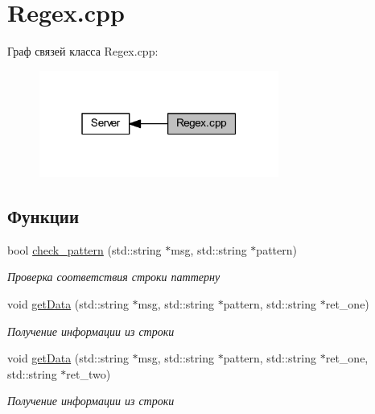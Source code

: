 \hypertarget{group__regexcpp}{}\section{Regex.\+cpp}
\label{group__regexcpp}
Граф связей класса Regex.\+cpp\+:
\nopagebreak
\begin{figure}[H]
\begin{center}
\leavevmode
\includegraphics[width=223pt]{group__regexcpp}
\end{center}
\end{figure}
\subsection*{Функции}
\begin{DoxyCompactItemize}
\item 
bool \mbox{\hyperlink{group__regexcpp_gac4882c93b963bd53fd60978a9661fa30}{check\+\_\+pattern}} (std\+::string $\ast$msg, std\+::string $\ast$pattern)
\begin{DoxyCompactList}\small\item\em Проверка соответствия строки паттерну \end{DoxyCompactList}\item 
void \mbox{\hyperlink{group__regexcpp_ga524588640ff7393a801141740202d9dc}{get\+Data}} (std\+::string $\ast$msg, std\+::string $\ast$pattern, std\+::string $\ast$ret\+\_\+one)
\begin{DoxyCompactList}\small\item\em Получение информации из строки \end{DoxyCompactList}\item 
void \mbox{\hyperlink{group__regexcpp_ga0ac985b5fff36005eb80cda832582ca9}{get\+Data}} (std\+::string $\ast$msg, std\+::string $\ast$pattern, std\+::string $\ast$ret\+\_\+one, std\+::string $\ast$ret\+\_\+two)
\begin{DoxyCompactList}\small\item\em Получение информации из строки \end{DoxyCompactList}\end{DoxyCompactItemize}


